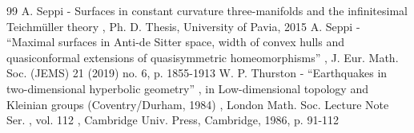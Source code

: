 \documentclass[10pt]{amsart}
\theoremstyle{plain}
\theoremstyle{definition}
\begin{document}
\begin{thebibliography}{99}
 A. Seppi - Surfaces in constant curvature three-manifolds and the infinitesimal Teichmüller theory , Ph. D. Thesis, University of Pavia, 2015
 A. Seppi - “Maximal surfaces in Anti-de Sitter space, width of convex hulls and quasiconformal extensions of quasisymmetric homeomorphisms” , J. Eur. Math. Soc. (JEMS) 21 (2019) no. 6, p. 1855-1913
 W. P. Thurston - “Earthquakes in two-dimensional hyperbolic geometry” , in Low-dimensional topology and Kleinian groups (Coventry/Durham, 1984) , London Math. Soc. Lecture Note Ser. , vol. 112 , Cambridge Univ. Press, Cambridge, 1986, p. 91-112
\end{thebibliography}
\end{document}
